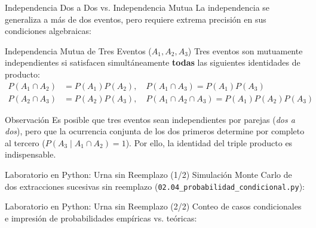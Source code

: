 \documentclass[10pt,aspectratio=169]{beamer}
\begin{document}
\begin{frame}{Independencia Dos a Dos vs. Independencia Mutua}
  \footnotesize
  La independencia se generaliza a más de dos eventos, pero requiere extrema precisión en sus condiciones algebraicas: \pause

  \vspace{0.1em}
  \begin{block}{Independencia Mutua de Tres Eventos ($A_1, A_2, A_3$)}
    Tres eventos son mutuamente independientes si satisfacen simultáneamente \textbf{todas} las siguientes identidades de producto:
    \begin{align*}
      P(A_1 \cap A_2) &= P(A_1)P(A_2), \quad P(A_1 \cap A_3) = P(A_1)P(A_3) \\
      P(A_2 \cap A_3) &= P(A_2)P(A_3), \quad P(A_1 \cap A_2 \cap A_3) = P(A_1)P(A_2)P(A_3)
    \end{align*}
  \end{block}

  \vspace{0.1em}
  \pause
  \begin{block}{Observación}
    Es posible que tres eventos sean independientes por parejas (\emph{dos a dos}), pero que la ocurrencia conjunta de los dos primeros determine por completo al tercero ($P(A_3 \mid A_1 \cap A_2) = 1$). Por ello, la identidad del triple producto es indispensable.
  \end{block}
\end{frame}

\begin{frame}[fragile]{Laboratorio en Python: Urna sin Reemplazo (1/2)}
  Simulación Monte Carlo de dos extracciones sucesivas sin reemplazo (\texttt{02.04\_probabilidad\_condicional.py}):
  \vspace{0.2em}
  {
  }
\end{frame}

\begin{frame}[fragile]{Laboratorio en Python: Urna sin Reemplazo (2/2)}
  Conteo de casos condicionales e impresión de probabilidades empíricas vs. teóricas:
  \vspace{0.2em}
  {
  }
\end{frame}
\end{document}
